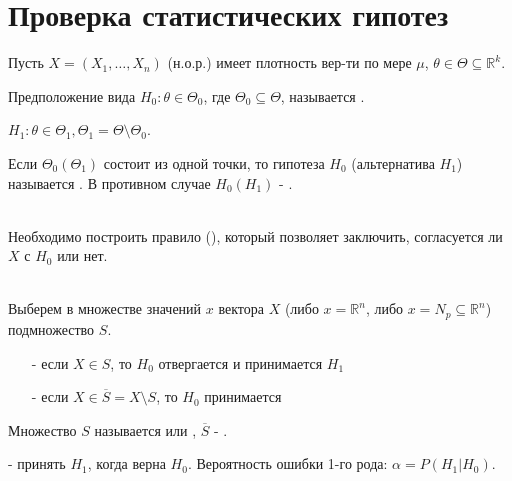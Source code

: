 \chapter{Проверка статистических гипотез}

Пусть $X = (X_1, \dots, X_n)$ (н.о.р.) имеет плотность вер-ти по мере $\mu$, $\theta \in \Theta \subseteq \mathbb{R}^k$.

\begin{definition}\label{lec:4/def:1}
	Предположение вида $H_0: \theta \in \Theta_0$, где $\Theta_0 \subseteq \Theta$, называется .
\end{definition}

\begin{definition}\label{lec:4/def:2}
	 $H_1: \theta \in \Theta_1, \Theta_1 = \Theta \setminus \Theta_0$. 
\end{definition}

\begin{definition}\label{lec:4/def:3}
	Если $\Theta_0 (\Theta_1)$ состоит из одной точки, то гипотеза $H_0$ (альтернатива $H_1$) называется . В противном случае $H_0 (H_1)$ - .
\end{definition}

\\
Необходимо построить правило (), который позволяет заключить, согласуется ли $X$ с $H_0$ или нет.

\\
Выберем в множестве значений $x$ вектора $X$ (либо $x = \mathbb{R}^n$, либо $x = N_p \subseteq \mathbb{R}^n$) подмножество $S$.
\begin{itemize}
	\item[-] если $X \in S$, то $H_0$ отвергается и принимается $H_1$
	\item[-] если $X \in \overline{S} = X \setminus S$, то $H_0$ принимается
\end{itemize}

\begin{definition}\label{lec:4/def:4}
	Множество $S$ называется  или , $\overline{S}$ - . 
\end{definition}


\begin{definition}\label{lec:4/def:5}
	 - принять $H_1$, когда верна $H_0$. Вероятность ошибки 1-го рода: $\alpha = P(H_1 | H_0)$.
\end{definition}

